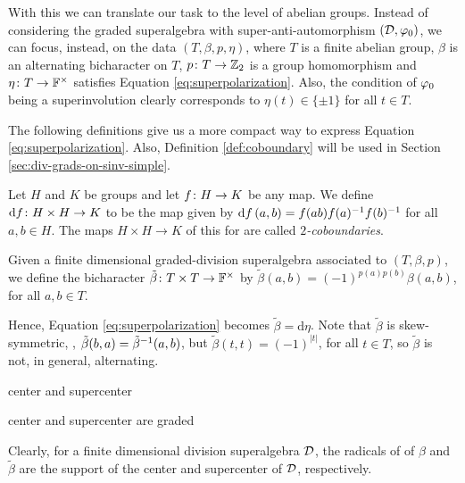 With this we can translate our task to the level of abelian groups. 
Instead of considering the graded superalgebra with super-anti-automorphism $(\mathcal{D}, \varphi_0)$, we can focus, instead, on the data $(T, \beta, p, \eta)$, where $T$ is a finite abelian group, $\beta$ is an alternating bicharacter on $T$, $p\colon T \to \mathbb{Z}_2$ is a group homomorphism and $\eta\colon T \to \mathbb{F}^\times$ satisfies Equation \eqref{eq:superpolarization}. 
Also, the condition of $\varphi_0$ being a superinvolution clearly corresponds to $\eta(t) \in \{ \pm 1 \}$ for all $t\in T$.

The following definitions give us a more compact way to express Equation \eqref{eq:superpolarization}. 
Also, Definition \ref{def:coboundary} will be used in Section \ref{sec:div-grads-on-sinv-simple}. 

\begin{defi}\label{def:coboundary}
    Let $H$ and $K$ be groups and let $f\colon H \to K$ be any map. 
    We define $\mathrm{d} f\colon H\times H \to K$ to be the map given by $\mathrm{d} f\, (a,b) = f(ab)f(a)^{-1} f(b)^{-1}$ for all $a,b \in H$. 
    The maps $H\times H \to K$ of this for are called \emph{$2$-coboundaries}.
\end{defi}

\begin{defi}\label{def:tilde-beta}
    Given a finite dimensional graded-division superalgebra associated to $(T, \beta, p)$, we define the bicharacter $\tilde\beta\colon T\times T \to \mathbb{F}^\times$ by $\tilde\beta (a,b) = (-1)^{p(a) p(b)} \beta(a, b)$, for all $a, b \in T$.
\end{defi}

Hence, Equation \eqref{eq:superpolarization} becomes $\tilde\beta = \mathrm{d}\eta$. 
Note that $\tilde\beta$ is skew-symmetric, \ie, $\tilde\beta(b, a) = \tilde\beta^{-1}(a, b)$, but $\tilde\beta (t,t) = (-1)^{|t|}$, for all $t\in T$, so $\tilde\beta$ is not, in general, alternating. 

\begin{defi}
    center and supercenter
\end{defi}

\begin{lemma}
    center and supercenter are graded
\end{lemma}

Clearly, for a finite dimensional division superalgebra $\mathcal{D}$, the radicals of of $\beta$ and $\tilde\beta$ are the support of the center and supercenter of $\mathcal{D}$, respectively. 


